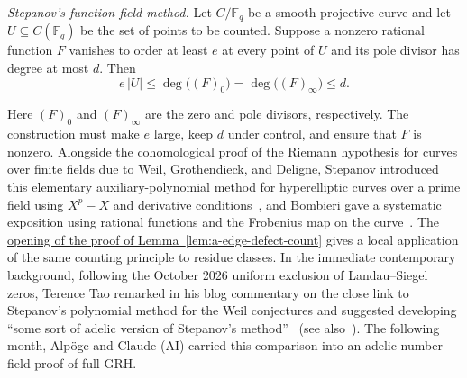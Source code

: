 \begin{samepage}
\leavevmode{}\label{par:stepanov-method}
\emph{Stepanov's function-field method.} Let $C/\mathbb F_q$ be a smooth projective curve and let $U\subseteq C(\mathbb F_q)$ be the set of points to be counted. Suppose a nonzero rational function $F$ vanishes to order at least $e$ at every point of $U$ and its pole divisor has degree at most $d$. Then
\[
 e\,|U|\le \deg\bigl((F)_0\bigr)=\deg\bigl((F)_\infty\bigr)\le d.
\]
\end{samepage}
Here $(F)_0$ and $(F)_\infty$ are the zero and pole divisors, respectively. The construction must make $e$ large, keep $d$ under control, and ensure that $F$ is nonzero. Alongside the cohomological proof of the Riemann hypothesis for curves over finite fields due to Weil, Grothendieck, and Deligne, Stepanov introduced this elementary auxiliary-polynomial method for hyperelliptic curves over a prime field using $X^p-X$ and derivative conditions~\cite{Stepanov1969}, and Bombieri gave a systematic exposition using rational functions and the Frobenius map on the curve~\cite[Sections~I--II]{Bombieri1974}. The \hyperref[par:a-stepanov-count]{opening of the proof of Lemma~\ref*{lem:a-edge-defect-count}} gives a local application of the same counting principle to residue classes. In the immediate contemporary background, following the October 2026 uniform exclusion of Landau--Siegel zeros, Terence Tao remarked in his blog commentary on the close link to Stepanov's polynomial method for the Weil conjectures and suggested developing ``some sort of adelic version of Stepanov's method''~\cite{Tao2026SiegelComment} (see also~\cite{SIYZ2026}). The following month, Alpöge and Claude (AI) carried this comparison into an adelic number-field proof of full GRH.
